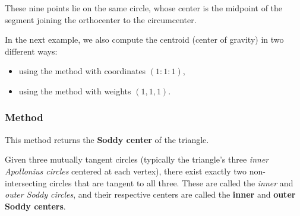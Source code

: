 \medskip
\noindent
These nine points lie on the same circle, whose center is the midpoint of the segment joining the orthocenter to the circumcenter.

\medskip
\noindent
In the next example, we also compute the centroid (center of gravity) in two different ways:
\begin{itemize}
  \item using the  method with coordinates $(1:1:1)$,
  \item using the  method with weights $(1,1,1)$.
\end{itemize}

\vspace{1em}

\begin{minipage}{.5\textwidth}
\begin{center}
\end{center}
\end{minipage}
\begin{minipage}{.5\textwidth}
\begin{tkzexample}
\end{tkzexample}
\end{minipage}


\subsubsection{Method } %
\label{ssub:method_triangle_soddy_center}

This method returns the \textbf{Soddy center} of the triangle.

\medskip
\noindent
Given three mutually tangent circles (typically the triangle’s three \emph{inner Apollonius circles} centered at each vertex), there exist exactly two non-intersecting circles that are tangent to all three. These are called the \emph{inner} and \emph{outer Soddy circles}, and their respective centers are called the \textbf{inner} and \textbf{outer Soddy centers}.

